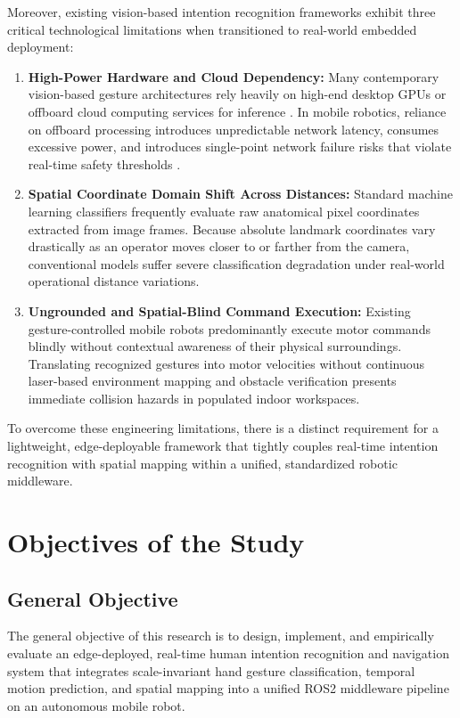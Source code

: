 Moreover, existing vision-based intention recognition frameworks exhibit three critical technological limitations when transitioned to real-world embedded deployment:
\begin{enumerate}
    \item \textbf{High-Power Hardware and Cloud Dependency:} Many contemporary vision-based gesture architectures rely heavily on high-end desktop GPUs or offboard cloud computing services for inference \cite{mahmud2022}. In mobile robotics, reliance on offboard processing introduces unpredictable network latency, consumes excessive power, and introduces single-point network failure risks that violate real-time safety thresholds \cite{tsitos2022}.
    \item \textbf{Spatial Coordinate Domain Shift Across Distances:} Standard machine learning classifiers frequently evaluate raw anatomical pixel coordinates extracted from image frames. Because absolute landmark coordinates vary drastically as an operator moves closer to or farther from the camera, conventional models suffer severe classification degradation under real-world operational distance variations.
    \item \textbf{Ungrounded and Spatial-Blind Command Execution:} Existing gesture-controlled mobile robots predominantly execute motor commands blindly without contextual awareness of their physical surroundings. Translating recognized gestures into motor velocities without continuous laser-based environment mapping and obstacle verification presents immediate collision hazards in populated indoor workspaces.
\end{enumerate}

To overcome these engineering limitations, there is a distinct requirement for a lightweight, edge-deployable framework that tightly couples real-time intention recognition with spatial mapping within a unified, standardized robotic middleware.

\section{Objectives of the Study}

\subsection{General Objective}
The general objective of this research is to design, implement, and empirically evaluate an edge-deployed, real-time human intention recognition and navigation system that integrates scale-invariant hand gesture classification, temporal motion prediction, and spatial mapping into a unified ROS2 middleware pipeline on an autonomous mobile robot.

